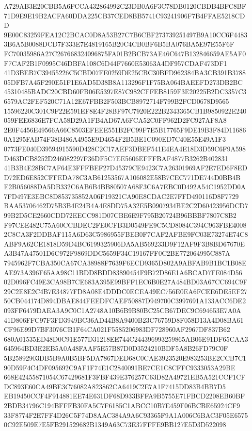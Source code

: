 \documentclass[UTF8,fontset=fandol,zihao=-4,a4paper]{ctexart}
\begin{document}
{{A729AB3E20CBB5A6FCCA432864992C23DB0A6F3C78DB0120CBDB4BFC8BF71D9E9E19B2ACFA60DDA225CB37CED8BB5741C93241906F7B4FFAE5218CDD
9E00C83259FEA12C2BCAC0D8A53B27C7B6CBF273739251497B9A10CC6F44833B6A5B0088DCD7F333E7E4819165B20C4CB0BF6B5BA076BA5E97E55F6F
FC70035986A27C267668324096875FA01B2BCB73AE46C647B132846659AE5AF0F7CAF2B1F0995C46DBFA108C6D44F7660E53063A4DF957CDAF473DF1
41D3BEB7C39455226C5CBD07FE0259DE25CBC30BFD962384BA3CB391B378805DFB7A45F290E51F1E6AD5D38B8A113296F1F75BA064BAEEFD273DB2BC
45310485BADC20CBD60FB06E5397E87C982CFFEB8159F3E20225B2DC3357C36579AC2FEF520C71A12E67FBB2F503BCB8972714F799B2FCD0678D9565
15596220C301C9F22E591EF8E4F28BF97C7920E222B2343365CB1B9850922E240059FEE6836E7FCA58D29A1FB4AD67A6FCA52C0FF962D2FC927AF8A8
2E0F4456E49566A66C8503EFEEE551B2FC99F7E5B17765F9DE19B3F84D116860A1295FAB74F38B486A4955E9D4654F2B5BE1C090ED7C40E55E49A1F3
0773FE040D39594915590D428C2C17AEF3DBEF541E4EA4E18D3D59C6F9A598D463DCB8252D246082297F36DF5C7EE5606EFFFBAF4877B3262B402831
41B3B4E28BC7AF64E3FFFBEF27D45379CE9423C7A26301969AF2E7ED6F8EDD72ED6E852CFFEDA78C3AB61253567A106082E58B7CEC771DE744D0BB4B
E2B056088DA5DB332C6AB6B4BB80507A68F3C6A7EBC0D492A54C1952DD0A7FD497E3EBC8D853735852A06F19321CA90E8CDAC2E7FFD490116D8F7729
BAA53706462D75B3B4E24B4A4E8DD75A32E5B0907934BE2C2D60423956DCD799B2D5CE2660CDD72EECC981D07CBE6E9F795B20724B96BBBF7807C8B2
F97CEE482C75A60CCBDEC2FE0CFB3D0549FE9C5CD8084C394C963FBE40082C8CA3F2DDBAF115A6D63C5986955FBEB0F7CAF2AFBE9FC03E73274E74C8
ABF9A62CE1818D59D4BC6199325906DA5AB569233D9F12AF9F3B8BD67670EA3B47A47501D6C972F9869DDC5659F34C19167FF0C2BE772064995C887A
7945962F7CBA350CA67CA38988F7639F6ECD9365D802A9ABFAB9B1BC1B08EAE973A396F65AA98C11BDD8BDD83890454F9B72D86E1A6BCAD7FE084D56
02D096FC49E3CA98B7CE683A395E99BFF1EC6B0E27A484BD03A67CC694C9F29C2E8E2C4B7E34877FD8A08E4DDDC0ECEA49EC756E0EA6FCEE6DE5EF27
50CB044174D894DBAE844FEEDFCAEF50887D949700C3997691A133ACC6DE2093FF6479DAEA3A9C0C1A2748A10B6B9B80BC25CB67DEC9C694653E7A0A
41D806FFC97F3FD3949BC36AD44B8A9400B23C76759D8F058D13A4D08BA61CF96E99D7BF3076CB1F64CA021F5585206983DF728960AF2967DF837B62
680A01535ED48D0C91E577D31218EE744C244396993259865AB06E91DF65CAA3645964BD3E2EB5A0A48FAAF5E57B87D0D3524210BDF5A8B26FD79C0F
5B25892903DB5B9A0B5BF5DA7867DED68C0CAE3923520E983253BE2CCB7C190D59F4C4DF095692C9AF1F74E1C2840091BE7CE1C8CFFC9333053A29BE
668E42455871054C67429681F3FBF439E376257C63D82A49721EB5A521CCF1CFDC893E60CA49BE3C76082A823862CA6419C2E7A1F7415DD83B4BB7D5
EB19450CCF4F914881EE74E631DF68D933BFFA9B5755E71FBCD2208EB60BF2BDB34796C194BFFFB30FA5C7F6185C1ABCC10B7E459F06BCBE65924CF9
33F8774F2E7FF4D26C5F74D8AAC384A9A6C93365F9A1A006C6BAC3F05E65750C92E509E7E5FB291529682B1349A63C73E37FFFE9BB127E5D3D522098
}}
\end{document}
